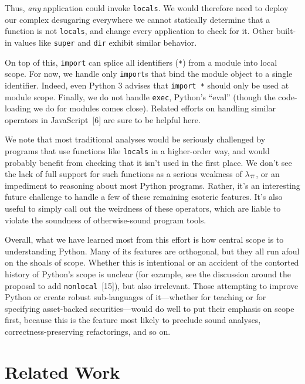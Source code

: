 \documentclass[10pt]{sigplanconf}
\newcommand{\sectionNewpage}{}
\newcommand{\Scribtexttt}[1]{{\texttt{#1}}}
\newcommand{\textsub}[1]{$_{\hbox{\textsmaller{#1}}}$}
\newcommand{\Larger}[1]{\textlarger{#1}}
\let\SOriginalthesubsection\thesubsection
\newcommand{\Ssection}[2]{\section[#1]{#2}\let\thesubsection\SOriginalthesubsection}
\begin{document}
\noindent Thus, \textit{any} application could invoke
\Scribtexttt{locals}.  We would therefore need to deploy our complex
desugaring everywhere we cannot statically determine that a function
is not \Scribtexttt{locals}, and change every application to check for it.
Other built{-}in values like \Scribtexttt{super} and \Scribtexttt{dir}
exhibit similar behavior.

On top of this, \Scribtexttt{import} can splice all identifiers
 (\Scribtexttt{*}) from a module into local scope. For
now, we handle only \Scribtexttt{import}s that bind the module object to a single
identifier. Indeed, even
Python 3 advises that \Scribtexttt{import *} should only be used
at module scope.  Finally, we do not handle \Scribtexttt{exec}, Python{'}s
{``}eval{''} (though the code{-}loading we do for modules comes close). Related
efforts on handling similar operators in
JavaScript~[6] are sure to be helpful here.

We note that most traditional analyses would be seriously challenged by
programs that use functions like \Scribtexttt{locals} in a higher{-}order way, and
would probably benefit from checking that it isn{'}t used in the first place.
We don{'}t see the lack of full support for such functions as a serious
weakness of $\lambda$\textsub{\Larger{$\pi$}}, or an impediment to reasoning about most Python
programs.  Rather, it{'}s an interesting future challenge to handle a few of
these remaining esoteric features. It{'}s also useful to simply call out the
weirdness of these operators, which are liable to violate the soundness of
otherwise{-}sound program tools.

Overall, what we have learned most from this effort is how central
scope is to understanding Python. Many of its features are orthogonal,
but they all run afoul on the shoals of scope. Whether this is
intentional or an accident of the contorted history of Python{'}s scope is unclear (for
example, see the discussion around the proposal to add
\Scribtexttt{nonlocal}~[15]),
but also irrelevant. Those attempting to improve Python or
create robust sub{-}languages of it{---}whether for teaching or for
specifying asset{-}backed securities{---}would do well to put
their emphasis on scope first, because this is the feature most likely
to preclude sound analyses, correctness{-}preserving refactorings, and
so on.

\sectionNewpage

\Ssection{Related Work}{Related Work}\label{t:x28part_x22sx3arelatedx22x29}
\end{document}

